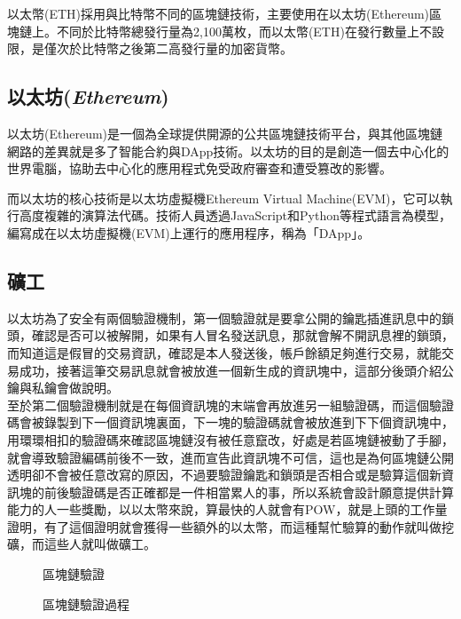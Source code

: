 \documentclass[12pt, a4paper]{article}
\begin{document}
以太幣(ETH)採用與比特幣不同的區塊鏈技術，主要使用在以太坊(Ethereum)區塊鏈上。不同於比特幣總發行量為2,100萬枚，而以太幣(ETH)在發行數量上不設限，是僅次於比特幣之後第二高發行量的加密貨幣。
\subsection{以太坊(\textsl{Ethereum})}
以太坊(Ethereum)是一個為全球提供開源的公共區塊鏈技術平台，與其他區塊鏈網路的差異就是多了智能合約與DApp技術。以太坊的目的是創造一個去中心化的世界電腦，協助去中心化的應用程式免受政府審查和遭受篡改的影響。 

而以太坊的核心技術是以太坊虛擬機Ethereum Virtual Machine(EVM)，它可以執行高度複雜的演算法代碼。技術人員透過JavaScript和Python等程式語言為模型，編寫成在以太坊虛擬機(EVM)上運行的應用程序，稱為「DApp」。
\subsection{礦工}
以太坊為了安全有兩個驗證機制，第一個驗證就是要拿公開的鑰匙插進訊息中的鎖頭，確認是否可以被解開，如果有人冒名發送訊息，那就會解不開訊息裡的鎖頭，而知道這是假冒的交易資訊，確認是本人發送後，帳戶餘額足夠進行交易，就能交易成功，接著這筆交易訊息就會被放進一個新生成的資訊塊中，這部分後頭介紹公鑰與私鑰會做說明。\\
至於第二個驗證機制就是在每個資訊塊的末端會再放進另一組驗證碼，而這個驗證碼會被錄製到下一個資訊塊裏面，下一塊的驗證碼就會被放進到下下個資訊塊中，用環環相扣的驗證碼來確認區塊鏈沒有被任意竄改，好處是若區塊鏈被動了手腳，就會導致驗證編碼前後不一致，進而宣告此資訊塊不可信，這也是為何區塊鏈公開透明卻不會被任意改寫的原因，不過要驗證鑰匙和鎖頭是否相合或是驗算這個新資訊塊的前後驗證碼是否正確都是一件相當累人的事，所以系統會設計願意提供計算能力的人一些獎勵，以以太幣來說，算最快的人就會有POW，就是上頭的工作量證明，有了這個證明就會獲得一些額外的以太幣，而這種幫忙驗算的動作就叫做挖礦，而這些人就叫做礦工。

\begin{figure}[h]
    \caption{區塊鏈驗證}
    \label{fig:區塊鏈驗證}
\end{figure}
\begin{figure}[h]
    \caption{區塊鏈驗證過程}
    \label{fig:區塊鏈驗證過程}
\end{figure}
\end{document}
